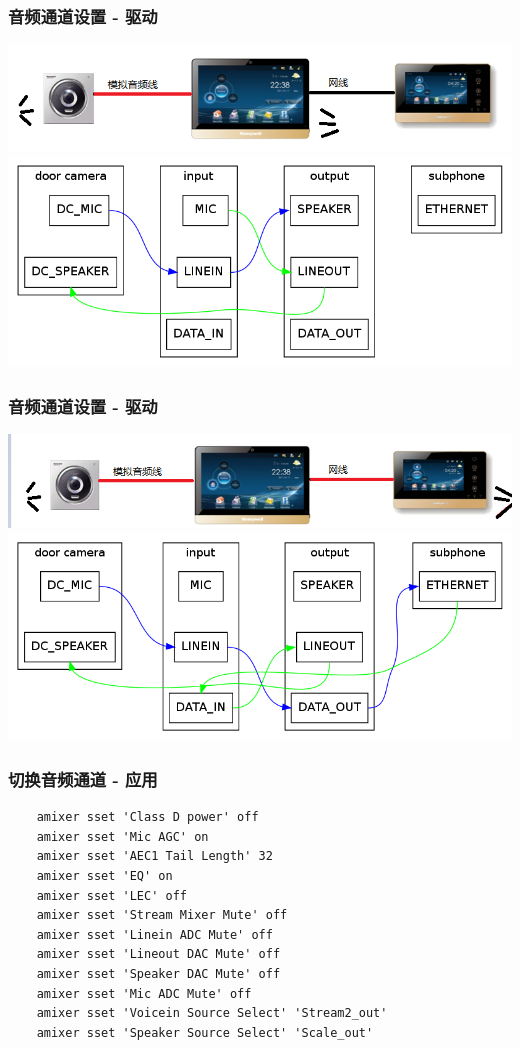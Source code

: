 \documentclass[CJK]{beamer}
\begin{document}
\begin{frame}
    \frametitle{音频通道设置 - 驱动}
    \includegraphics[height=50bp]{"audio_path_scene2.png"}
    \newline
    \includegraphics[height=120bp]{"audio_path_main_dc.png"}
\end{frame}

\begin{frame}
    \frametitle{音频通道设置 - 驱动}
    \includegraphics[height=50bp]{"audio_path_scene3.png"}
    \newline
    \includegraphics[height=120bp]{"audio_path_subphone.png"}
\end{frame}

\begin{frame}[fragile]
    \frametitle{切换音频通道 - 应用}
    \begin{verbatim}
    amixer sset 'Class D power' off
    amixer sset 'Mic AGC' on
    amixer sset 'AEC1 Tail Length' 32
    amixer sset 'EQ' on
    amixer sset 'LEC' off
    amixer sset 'Stream Mixer Mute' off
    amixer sset 'Linein ADC Mute' off
    amixer sset 'Lineout DAC Mute' off
    amixer sset 'Speaker DAC Mute' off
    amixer sset 'Mic ADC Mute' off
    amixer sset 'Voicein Source Select' 'Stream2_out'
    amixer sset 'Speaker Source Select' 'Scale_out'
    \end{verbatim}
\end{frame}
\end{document}
